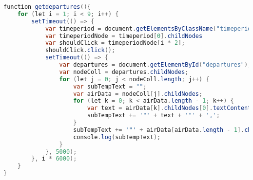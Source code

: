 \documentclass{cumcmthesis}
\begin{document}
\begin{appendices}
\begin{lstlisting}[language=java]
function getdepartures(){
    for (let i = 1; i < 9; i++) {
        setTimeout(() => {
            var timeperiod = document.getElementsByClassName("timeperiod");
            var timeperiodNode = timeperiod[0].childNodes
            var shouldClick = timeperiodNode[i * 2];
            shouldClick.click();
            setTimeout(() => {
                var departures = document.getElementById("departures");
                var nodeColl = departures.childNodes;
                for (let j = 0; j < nodeColl.length; j++) {
                    var subTempText = "";
                    var airData = nodeColl[j].childNodes;
                    for (let k = 0; k < airData.length - 1; k++) {
                        var text = airData[k].childNodes[0].textContent;
                        subTempText += '"' + text + '"' + ',';
                    }
                    subTempText += '"' + airData[airData.length - 1].childNodes[0].textContent + '"';
                    console.log(subTempText);
                }
            }, 5000);
        }, i * 6000);
    }    
}

\end{lstlisting}
\end{appendices}
\end{document}
